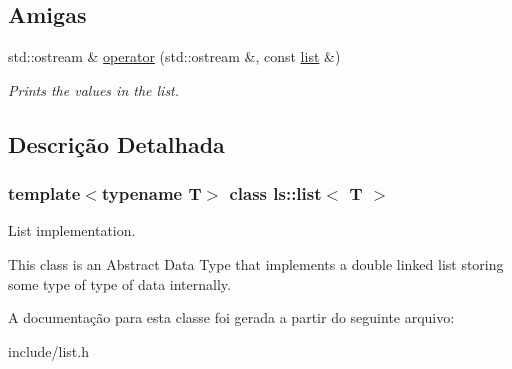 \subsection*{Amigas}
\begin{DoxyCompactItemize}
\item 
\mbox{\label{classls_1_1list_a0a2ac3f54c0cd7d0c0a1357ed1e4c5ea}} 
std\+::ostream \& \hyperlink{classls_1_1list_a0a2ac3f54c0cd7d0c0a1357ed1e4c5ea}{operator} (std\+::ostream \&, const \hyperlink{classls_1_1list}{list} \&)
\begin{DoxyCompactList}\small\item\em Prints the values in the list. \end{DoxyCompactList}\end{DoxyCompactItemize}


\subsection{Descrição Detalhada}
\subsubsection*{template$<$typename T$>$\newline
class ls\+::list$<$ T $>$}

List implementation. 

This class is an Abstract Data Type that implements a double linked list storing some type of type of data internally. 

A documentação para esta classe foi gerada a partir do seguinte arquivo\+:\begin{DoxyCompactItemize}
\item 
include/list.\+h\end{DoxyCompactItemize}
